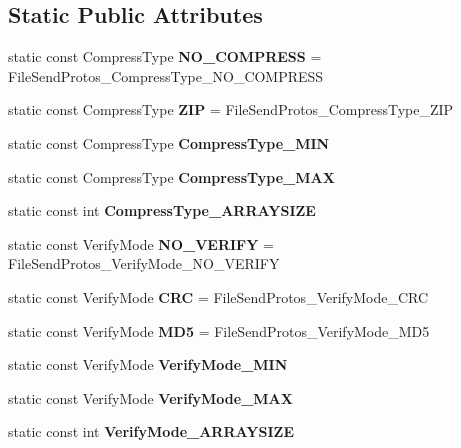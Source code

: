 \subsection*{Static Public Attributes}
\begin{DoxyCompactItemize}
\item 
\mbox{\label{classruntime_1_1FileSendProtos_a550ddbf179c7f60b3d82115c735c03f8}} 
static const Compress\+Type {\bfseries N\+O\+\_\+\+C\+O\+M\+P\+R\+E\+SS} = File\+Send\+Protos\+\_\+\+Compress\+Type\+\_\+\+N\+O\+\_\+\+C\+O\+M\+P\+R\+E\+SS
\item 
\mbox{\label{classruntime_1_1FileSendProtos_a3d1e3a78d8afd201628cd7c999f6457f}} 
static const Compress\+Type {\bfseries Z\+IP} = File\+Send\+Protos\+\_\+\+Compress\+Type\+\_\+\+Z\+IP
\item 
static const Compress\+Type {\bfseries Compress\+Type\+\_\+\+M\+IN}
\item 
static const Compress\+Type {\bfseries Compress\+Type\+\_\+\+M\+AX}
\item 
static const int {\bfseries Compress\+Type\+\_\+\+A\+R\+R\+A\+Y\+S\+I\+ZE}
\item 
\mbox{\label{classruntime_1_1FileSendProtos_ad2c2c3f944062df7f74b1d330147174c}} 
static const Verify\+Mode {\bfseries N\+O\+\_\+\+V\+E\+R\+I\+FY} = File\+Send\+Protos\+\_\+\+Verify\+Mode\+\_\+\+N\+O\+\_\+\+V\+E\+R\+I\+FY
\item 
\mbox{\label{classruntime_1_1FileSendProtos_a66df3ee84f5b7f92cdf118c535efee9e}} 
static const Verify\+Mode {\bfseries C\+RC} = File\+Send\+Protos\+\_\+\+Verify\+Mode\+\_\+\+C\+RC
\item 
\mbox{\label{classruntime_1_1FileSendProtos_a947a2af0687df40dabf09f69a22c0172}} 
static const Verify\+Mode {\bfseries M\+D5} = File\+Send\+Protos\+\_\+\+Verify\+Mode\+\_\+\+M\+D5
\item 
static const Verify\+Mode {\bfseries Verify\+Mode\+\_\+\+M\+IN}
\item 
static const Verify\+Mode {\bfseries Verify\+Mode\+\_\+\+M\+AX}
\item 
static const int {\bfseries Verify\+Mode\+\_\+\+A\+R\+R\+A\+Y\+S\+I\+ZE}
\item 

\end{DoxyCompactItemize}
